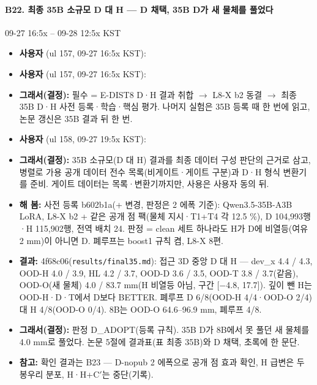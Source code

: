 \paragraph{B22. 최종 35B 소규모 D 대 H --- D 채택, 35B D가 새 물체를 풀었다}
{\small 09-27 16:5x -- 09-28 12:5x KST}
\begin{itemize}
  \item \textbf{사용자} (ul 157, 09-27 16:5x KST): 
  \item \textbf{사용자} (ul 157, 09-27 16:5x KST): 
  \item \textbf{그래서(결정):} 필수 = E-DIST8 D·H 결과 취합 $\rightarrow$ L8-X b2 동결 $\rightarrow$ 최종 35B D·H 사전 등록·학습·핵심 평가. 나머지 실험은 35B 등록 때 한 번에 읽고, 논문 갱신은 35B 결과 뒤 한 번.
  \item \textbf{사용자} (ul 158, 09-27 19:5x KST): 
  \item \textbf{그래서(결정):} 35B 소규모(D 대 H) 결과를 최종 데이터 구성 판단의 근거로 삼고, 병렬로 가용 공개 데이터 전수 목록(비게이트·게이트 구분)과 D·H 형식 변환기를 준비. 게이트 데이터는 목록·변환기까지만, 사용은 사용자 동의 뒤.
  \item \textbf{해 봄:} 사전 등록 b602b1a(+ 변경, 판정은 2 에폭 기준): Qwen3.5-35B-A3B LoRA, L8-X b2 + 같은 공개 점 팩(물체 지시·T1+T4 각 12.5 \%), D 104,993행·H 115,902행, 전역 배치 24. 판정 = clean 세트 하나라도 H가 D에 비열등(여유 2 mm)이 아니면 D. 폐루프는 boost1 규칙 켬, L8-X 8편.
  \item \textbf{결과:} 4f68c06(\texttt{results/\allowbreak{}final35.\allowbreak{}md}): 접근 3D 중앙 D 대 H --- dev\_x 4.4 / 4.3, OOD-H 4.0 / 3.9, HL 4.2 / 3.7, OOD-D 3.6 / 3.5, OOD-T 3.8 / 3.7(같음), OOD-O(새 물체) 4.0 / 83.7 mm(H 비열등 아님, 구간 [$-$4.8, 17.7]). 깊이 뺀 H는 OOD-H·D·T에서 D보다 BETTER. 폐루프 D 6/8(OOD-H 4/4·OOD-O 2/4) 대 H 4/8(OOD-O 0/4). 8B는 OOD-O 64.6--96.9 mm, 폐루프 4/8.
  \item \textbf{그래서(결정):} 판정 D\_ADOPT(등록 규칙). 35B D가 8B에서 못 풀던 새 물체를 4.0 mm로 풀었다. 논문 5절에 결과표(표 최종 35B)와 D 채택, 초록에 한 문단.
  \item \textbf{참고:} 확인 결과는 B23 --- D-nopub 2 에폭으로 공개 점 효과 확인, H 급변은 두 봉우리 분포, H·H+C$'$는 중단(기록).
\end{itemize}

